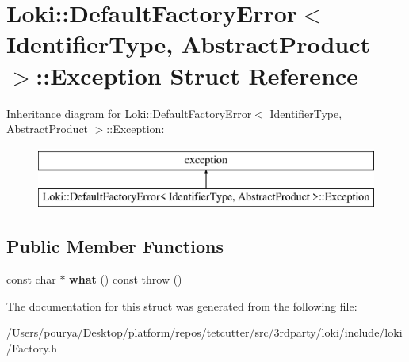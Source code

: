 \hypertarget{structLoki_1_1DefaultFactoryError_1_1Exception}{}\section{Loki\+:\+:Default\+Factory\+Error$<$ Identifier\+Type, Abstract\+Product $>$\+:\+:Exception Struct Reference}
\label{structLoki_1_1DefaultFactoryError_1_1Exception}
Inheritance diagram for Loki\+:\+:Default\+Factory\+Error$<$ Identifier\+Type, Abstract\+Product $>$\+:\+:Exception\+:\begin{figure}[H]
\begin{center}
\leavevmode
\includegraphics[height=2.000000cm]{structLoki_1_1DefaultFactoryError_1_1Exception}
\end{center}
\end{figure}
\subsection*{Public Member Functions}
\begin{DoxyCompactItemize}
\item 
\hypertarget{structLoki_1_1DefaultFactoryError_1_1Exception_ad32443fe767eadb6446a6c366988908e}{}const char $\ast$ {\bfseries what} () const   throw ()\label{structLoki_1_1DefaultFactoryError_1_1Exception_ad32443fe767eadb6446a6c366988908e}

\end{DoxyCompactItemize}


The documentation for this struct was generated from the following file\+:\begin{DoxyCompactItemize}
\item 
/\+Users/pourya/\+Desktop/platform/repos/tetcutter/src/3rdparty/loki/include/loki/Factory.\+h\end{DoxyCompactItemize}
